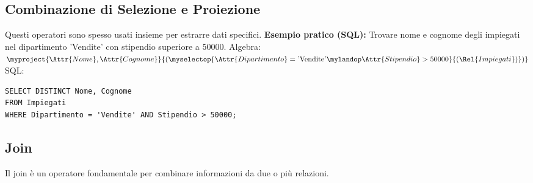 \subsection{Combinazione di Selezione e Proiezione}
Questi operatori sono spesso usati insieme per estrarre dati specifici.
\textbf{Esempio pratico (SQL):} Trovare nome e cognome degli impiegati nel dipartimento 'Vendite' con stipendio superiore a 50000.
Algebra: $\myproject{\Attr{Nome}, \Attr{Cognome}}{(\myselectop{\Attr{Dipartimento} = \text{'Vendite'} \mylandop \Attr{Stipendio} > 50000}{(\Rel{Impiegati})})}$
SQL:
\begin{verbatim}
SELECT DISTINCT Nome, Cognome
FROM Impiegati
WHERE Dipartimento = 'Vendite' AND Stipendio > 50000;
\end{verbatim}

\subsection{Join}
Il join è un operatore fondamentale per combinare informazioni da due o più relazioni.
